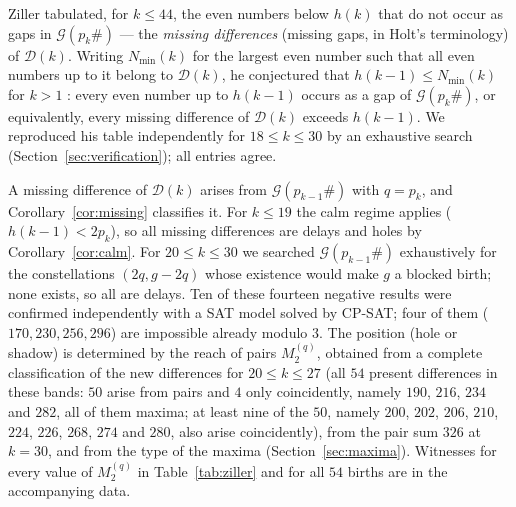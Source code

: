 \documentclass[11pt]{article}
\theoremstyle{definition}
\theoremstyle{remark}
\newcommand{\G}{\mathcal{G}}
\newcommand{\D}{\mathcal{D}}
\begin{document}
Ziller \cite{Zi20} tabulated, for $k \le 44$, the even numbers below $h(k)$ that do not occur as gaps in $\G(p_k\#)$ --- the \emph{missing differences} (missing gaps, in Holt's terminology) of $\D(k)$. Writing $N_{\min}(k)$ for the largest even number such that all even numbers up to it belong to $\D(k)$, he conjectured that $h(k-1) \le N_{\min}(k)$ for $k > 1$ \cite[Conj.~4.1]{Zi20}: every even number up to $h(k-1)$ occurs as a gap of $\G(p_k\#)$, or equivalently, every missing difference of $\D(k)$ exceeds $h(k-1)$. We reproduced his table independently for $18 \le k \le 30$ by an exhaustive search (Section~\ref{sec:verification}); all entries agree.

A missing difference of $\D(k)$ arises from $\G(p_{k-1}\#)$ with $q = p_k$, and Corollary~\ref{cor:missing} classifies it. For $k \le 19$ the calm regime applies ($h(k-1) < 2p_k$), so all missing differences are delays and holes by Corollary~\ref{cor:calm}. For $20 \le k \le 30$ we searched $\G(p_{k-1}\#)$ exhaustively for the constellations $(2q, g - 2q)$ whose existence would make $g$ a blocked birth; none exists, so all are delays. Ten of these fourteen negative results were confirmed independently with a SAT model solved by CP-SAT; four of them ($170, 230, 256, 296$) are impossible already modulo $3$. The position (hole or shadow) is determined by the reach of pairs $M^{(q)}_2$, obtained from a complete classification of the new differences for $20 \le k \le 27$ (all $54$ present differences in these bands: $50$ arise from pairs and $4$ only coincidently, namely $190$, $216$, $234$ and $282$, all of them maxima; at least nine of the $50$, namely $200$, $202$, $206$, $210$, $224$, $226$, $268$, $274$ and $280$, also arise coincidently), from the pair sum $326$ at $k = 30$, and from the type of the maxima (Section~\ref{sec:maxima}). Witnesses for every value of $M^{(q)}_2$ in Table~\ref{tab:ziller} and for all $54$ births are in the accompanying data.
\end{document}
